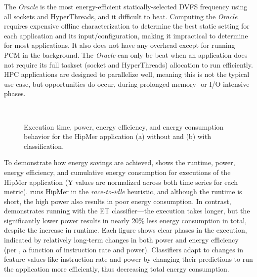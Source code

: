 The \emph{Oracle} is the most energy-efficient statically-selected DVFS frequency using all sockets and HyperThreads, and it difficult to beat.
Computing the \emph{Oracle} requires expensive offline characterization to determine the best static setting for each application and its input/configuration, making it impractical to determine for most applications.
It also does not have any overhead except for running PCM in the background.
The \emph{Oracle} can only be beat when an application does not require its full taskset (socket and HyperThreads) allocation to run efficiently.
HPC applications are designed to parallelize well, meaning this is not the typical use case, but opportunities do occur, \eg during prolonged memory- or I/O-intensive phases.

\begin{figure}[t]
  \centering
  \subfloat[HipMer in naive static \emph{race-to-idle} heuristic.]
  {\centering 
  \label{fig:ts-hipmer-dvfs}
  }
  \\
  \subfloat[HipMer with ET classifier at 5 second intervals.]
  {\centering 
  \label{fig:ts-hipmer-all-et}
  }
  \caption{Execution time, power, energy efficiency, and energy consumption behavior for the HipMer application (a) without and (b) with classification.}
  \label{fig:ts-hipmer}
\end{figure}

To demonstrate how energy savings are achieved,  shows the runtime, power, energy efficiency, and cumulative energy consumption for executions of the HipMer application (Y values are normalized across both time series for each metric).
 runs HipMer in the \emph{race-to-idle} heuristic, and although the runtime is short, the high power also results in poor energy consumption.
In contrast,  demonstrates running with the ET classifier---the execution takes longer, but the significantly lower power results in nearly 20\% less energy consumption in total, despite the increase in runtime.
Each figure shows clear phases in the execution, indicated by relatively long-term changes in both power and energy efficiency (per , a function of instruction rate and power).
Classifiers adapt to changes in feature values like instruction rate and power by changing their predictions to run the application more efficiently, thus decreasing total energy consumption.


